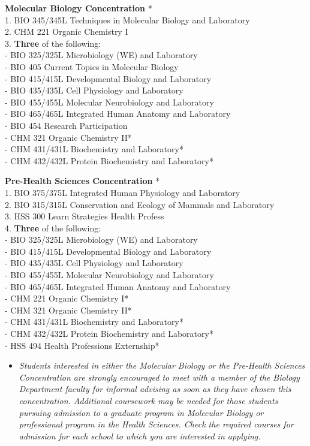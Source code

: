 \documentclass[
  letterpaper,
]{scrbook}
\providecommand{\tightlist}{%
  \setlength{\itemsep}{0pt}\setlength{\parskip}{0pt}}
\begin{document}
\textbf{Molecular Biology Concentration} *\\
1. BIO 345/345L Techniques in Molecular Biology and Laboratory\\
2. CHM 221 Organic Chemistry I\\
3. \textbf{Three} of the following:\\
- BIO 325/325L Microbiology (WE) and Laboratory\\
- BIO 405 Current Topics in Molecular Biology\\
- BIO 415/415L Developmental Biology and Laboratory\\
- BIO 435/435L Cell Physiology and Laboratory\\
- BIO 455/455L Molecular Neurobiology and Laboratory\\
- BIO 465/465L Integrated Human Anatomy and Laboratory\\
- BIO 454 Research Participation\\
- CHM 321 Organic Chemistry II*\\
- CHM 431/431L Biochemistry and Laboratory*\\
- CHM 432/432L Protein Biochemistry and Laboratory*

\textbf{Pre-Health Sciences Concentration} *\\
1. BIO 375/375L Integrated Human Physiology and Laboratory\\
2. BIO 315/315L Conservation and Ecology of Mammals and Laboratory\\
3. HSS 300 Learn Strategies Health Profess\\
4. \textbf{Three} of the following:\\
- BIO 325/325L Microbiology (WE) and Laboratory\\
- BIO 415/415L Developmental Biology and Laboratory\\
- BIO 435/435L Cell Physiology and Laboratory\\
- BIO 455/455L Molecular Neurobiology and Laboratory\\
- BIO 465/465L Integrated Human Anatomy and Laboratory\\
- CHM 221 Organic Chemistry I*\\
- CHM 321 Organic Chemistry II*\\
- CHM 431/431L Biochemistry and Laboratory*\\
- CHM 432/432L Protein Biochemistry and Laboratory*\\
- HSS 494 Health Professions Externship*

\begin{itemize}
\tightlist
\item
  \emph{Students interested in either the Molecular Biology or the
  Pre-Health Sciences Concentration are strongly encouraged to meet with
  a member of the Biology Department faculty for informal advising as
  soon as they have chosen this concentration. Additional coursework may
  be needed for those students pursuing admission to a graduate program
  in Molecular Biology or professional program in the Health Sciences.
  Check the required courses for admission for each school to which you
  are interested in applying.}
\end{itemize}
\end{document}
